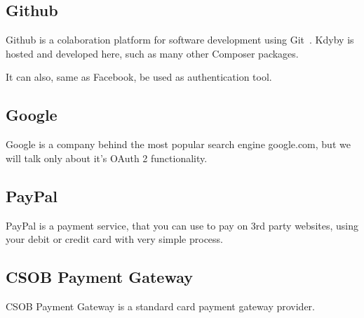\subsection{Github} \label{sec:theory:github}

Github is a colaboration platform for software development using Git~\cite{wiki:git}. Kdyby is hosted and developed here, such as many other Composer packages.

It can also, same as Facebook, be used as authentication tool.

\subsection{Google} \label{sec:theory:google}

Google is a company behind the most popular search engine google.com, but we will talk only about it's OAuth 2 functionality.

\subsection{PayPal} \label{sec:theory:paypal}

PayPal is a payment service, that you can use to pay on 3rd party websites, using your debit or credit card with very simple process.

\subsection{CSOB Payment Gateway} \label{sec:theory:csob-payment}

CSOB Payment Gateway is a standard card payment gateway provider.
